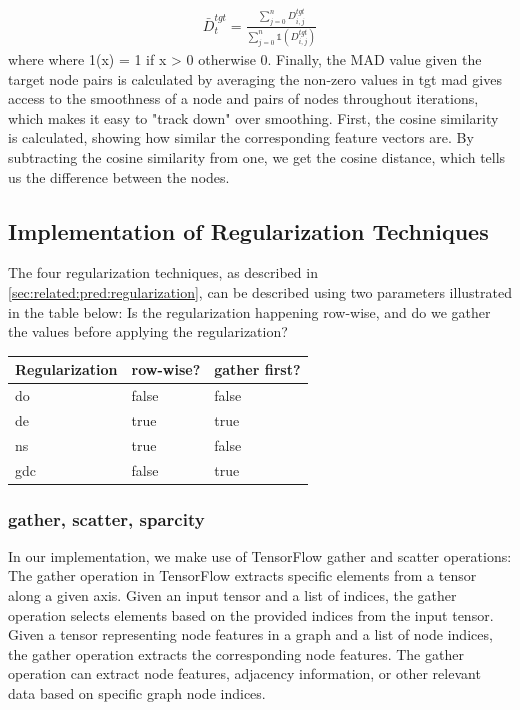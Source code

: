 \begin{align*}
    \bar{D}_{t}^{tgt} = \frac{\sum_{j=0}^{n}D_{i,j}^{tgt}}{\sum_{j=0}^{n}\mathds{1}(D_{i,j}^{tgt})}
\end{align*}
where where 1(x) = 1 if x > 0 otherwise 0. Finally, the MAD
value given the target node pairs is calculated by averaging
the non-zero values in
tgt
\Ac{mad} gives access to the smoothness of a node and pairs of nodes throughout iterations, which makes it easy to "track down" over smoothing.
First, the cosine similarity is calculated, showing how similar the corresponding feature vectors are. By subtracting the cosine similarity from one, we get the cosine distance, which tells us the difference between the nodes.


\subsection{Implementation of Regularization Techniques}
\label{sec:implement:setup: regularization}




The four regularization techniques, as described in \ref{sec:related:pred:regularization}, can be described using two parameters illustrated in the table below: Is the regularization happening row-wise, and do we gather the values before applying the regularization?
\begin{center}
    \begin{tabular}{lll}
        \toprule
        \textbf{Regularization} & \textbf{row-wise?} & \textbf{gather first?} \\
        \midrule
        \acf{do}                & false              & false                  \\
        \acf{de}                & true               & true                   \\
        \acf{ns}                & true               & false                  \\
        \acf{gdc}               & false              & true                   \\

        \bottomrule
    \end{tabular}
\end{center}
\subsubsection{gather, scatter, sparcity}
In our implementation, we make use of TensorFlow gather and scatter operations:
The gather operation in TensorFlow extracts specific elements from a tensor along a given axis. Given an input tensor and a list of indices, the gather operation selects elements based on the provided indices from the input tensor. Given a tensor representing node features in a graph and a list of node indices, the gather operation extracts the corresponding node features. The gather operation can extract node features, adjacency information, or other relevant data based on specific graph node indices.

